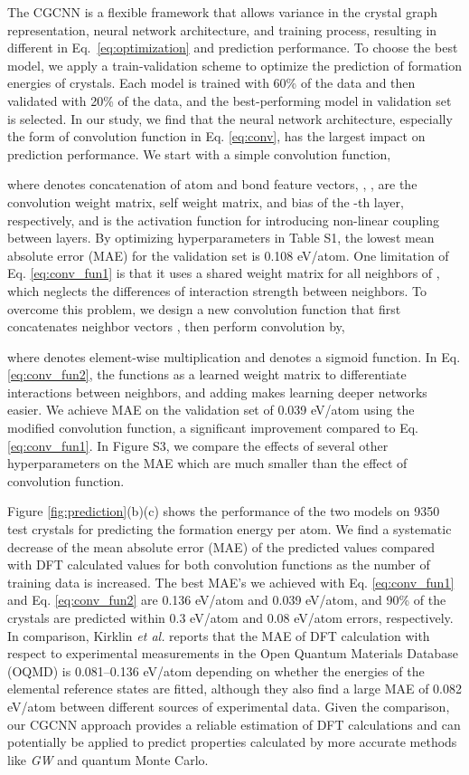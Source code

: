 \documentclass[twocolumn, prl]{revtex4-1}
\begin{document}
The CGCNN is a flexible framework that allows variance in the crystal graph representation, neural network architecture, and training process, resulting in different  in Eq.~\ref{eq:optimization} and prediction performance. To choose the best model, we apply a train-validation scheme to optimize the prediction of formation energies of crystals. Each model is trained with 60\% of the data and then validated with 20\% of the data, and the best-performing model in validation set is selected. In our study, we find that the neural network architecture, especially the form of convolution function in Eq. \ref{eq:conv}, has the largest impact on prediction performance. We start with a simple convolution function,
\small

\normalsize
where  denotes concatenation of atom and bond feature vectors, , ,  are the convolution weight matrix, self weight matrix, and bias of the -th layer, respectively, and  is the activation function for introducing non-linear coupling between layers. By optimizing hyperparameters in Table S1, the lowest mean absolute error (MAE) for the validation set is 0.108 eV/atom. One limitation of Eq. \ref{eq:conv_fun1} is that it uses a shared weight matrix  for all neighbors of , which neglects the differences of interaction strength between neighbors. To overcome this problem, we design a new convolution function that first concatenates neighbor vectors , then perform convolution by,

where  denotes element-wise multiplication and  denotes a sigmoid function. In Eq. \ref{eq:conv_fun2}, the  functions as a learned weight matrix to differentiate interactions between neighbors, and adding  makes learning deeper networks easier\cite{he2016deep}. We achieve MAE on the validation set of 0.039 eV/atom using the modified convolution function, a significant improvement compared to Eq. \ref{eq:conv_fun1}. In Figure S3, we compare the effects of several other hyperparameters on the MAE which are much smaller than the effect of convolution function. 


Figure \ref{fig:prediction}(b)(c) shows the performance of the two models on 9350 test crystals for predicting the formation energy per atom. We find a systematic decrease of the mean absolute error (MAE) of the predicted values compared with DFT calculated values for both convolution functions as the number of training data is increased. The best MAE's we achieved with Eq. \ref{eq:conv_fun1} and Eq. \ref{eq:conv_fun2} are 0.136 eV/atom and 0.039 eV/atom, and 90\% of the crystals are predicted within 0.3 eV/atom and 0.08 eV/atom errors, respectively. In comparison, Kirklin \textit{et al.} reports that the MAE of DFT calculation with respect to experimental measurements in the Open Quantum Materials Database (OQMD) is 0.081--0.136 eV/atom depending on whether the energies of the elemental reference states are fitted, although they also find a large MAE of 0.082 eV/atom between different sources of experimental data. Given the comparison, our CGCNN approach provides a reliable estimation of DFT calculations and can potentially be applied to predict properties calculated by more accurate methods like \textit{GW}\cite{hybertsen1986electron} and quantum Monte Carlo\cite{foulkes2001quantum}.
\end{document}
